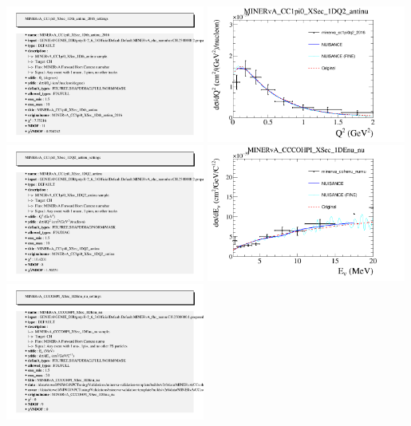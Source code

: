 \documentclass{article}
\begin{document}
\includegraphics[width=0.49\textwidth]{figures/minerva_cc1pi0pionangle_2016_info.png}
\centering
\includegraphics[width=0.49\textwidth]{figures/minerva_cc1pi0q2_2016_comp.png}
\includegraphics[width=0.49\textwidth]{figures/minerva_cc1pi0q2_2016_info.png}
\centering
\includegraphics[width=0.49\textwidth]{figures/minerva_cohenu_numu_comp.png}
\includegraphics[width=0.49\textwidth]{figures/minerva_cohenu_numu_info.png}
\end{document}
